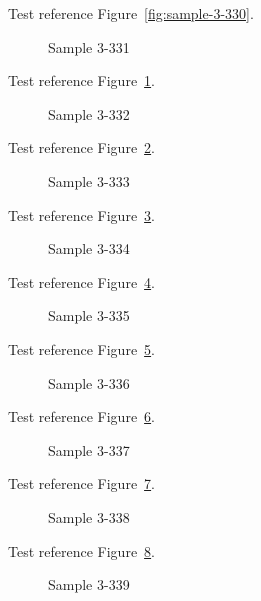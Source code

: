 Test reference Figure~\ref{fig:sample-3-330}.

\begin{figure}[tbhp]
\caption{Sample 3-331}
\label{fig:sample-3-331}
\end{figure}

Test reference Figure~\ref{fig:sample-3-331}.

\begin{figure}[tbhp]
\caption{Sample 3-332}
\label{fig:sample-3-332}
\end{figure}

Test reference Figure~\ref{fig:sample-3-332}.

\begin{figure}[tbhp]
\caption{Sample 3-333}
\label{fig:sample-3-333}
\end{figure}

Test reference Figure~\ref{fig:sample-3-333}.

\begin{figure}[tbhp]
\caption{Sample 3-334}
\label{fig:sample-3-334}
\end{figure}

Test reference Figure~\ref{fig:sample-3-334}.

\begin{figure}[tbhp]
\caption{Sample 3-335}
\label{fig:sample-3-335}
\end{figure}

Test reference Figure~\ref{fig:sample-3-335}.

\begin{figure}[tbhp]
\caption{Sample 3-336}
\label{fig:sample-3-336}
\end{figure}

Test reference Figure~\ref{fig:sample-3-336}.

\begin{figure}[tbhp]
\caption{Sample 3-337}
\label{fig:sample-3-337}
\end{figure}

Test reference Figure~\ref{fig:sample-3-337}.

\begin{figure}[tbhp]
\caption{Sample 3-338}
\label{fig:sample-3-338}
\end{figure}

Test reference Figure~\ref{fig:sample-3-338}.

\begin{figure}[tbhp]
\caption{Sample 3-339}
\label{fig:sample-3-339}
\end{figure}

